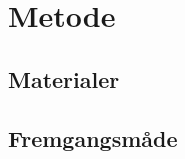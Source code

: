 \chapter{Metode}\label{ch:Metode}

\section{Materialer}\label{sec:metode-materialer}
\lipsum[1-2]

\section{Fremgangsmåde}\label{sec:metode-fremgangsmåde}